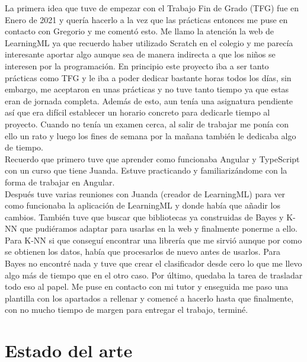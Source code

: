 \documentclass[a4paper, 12pt]{book}
\begin{document}
La primera idea que tuve de empezar con el Trabajo Fin de Grado (TFG) fue en Enero de 2021 y quería hacerlo a la vez que las prácticas entonces me puse en contacto con Gregorio y me comentó esto. Me llamo la atención la web de LearningML ya que recuerdo haber utilizado Scratch en el colegio y me parecía interesante aportar algo aunque sea de manera indirecta a que los niños se interesen por la programación.
En principio este proyecto iba a ser tanto prácticas como TFG y le iba a poder dedicar bastante horas todos los días, sin embargo, me aceptaron en unas prácticas y no tuve tanto tiempo ya que estas eran de jornada completa. Además de esto, aun tenía una asignatura pendiente así que era difícil establecer un horario concreto para dedicarle tiempo al proyecto. Cuando no tenía un examen cerca, al salir de trabajar me ponía con ello un rato y luego los fines de semana por la mañana también le dedicaba algo de tiempo. \\
Recuerdo que primero tuve que aprender como funcionaba Angular y TypeScript con un curso que tiene Juanda. Estuve practicando y familiarizándome con la forma de trabajar en Angular.\\
Después tuve varias reuniones con Juanda (creador de LearningML) para ver como funcionaba la aplicación de LearningML y donde había que añadir los cambios.
También tuve que buscar que bibliotecas ya construidas de Bayes y K-NN que pudiéramos adaptar para usarlas en la web y finalmente ponerme a ello. Para K-NN si que conseguí encontrar una librería que me sirvió aunque por como se obtienen los datos, había que procesarlos de nuevo antes de usarlos. Para Bayes no encontré nada y tuve que crear el clasificador desde cero lo que me llevo algo más de tiempo que en el otro caso.
Por último, quedaba la tarea de trasladar todo eso al papel. Me puse en contacto con mi tutor y enseguida me paso una plantilla con los apartados a rellenar y comencé a hacerlo hasta que finalmente, con no mucho tiempo de margen para entregar el trabajo, terminé.



\cleardoublepage
\chapter{Estado del arte}
\label{chap:estado}
\end{document}
